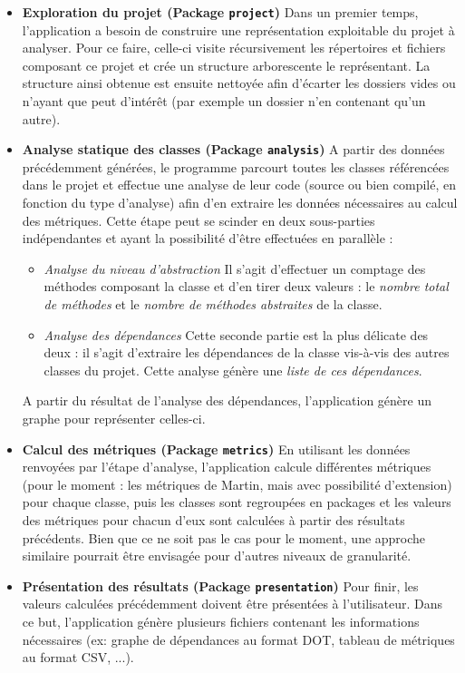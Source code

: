 \documentclass{scrartcl}
\begin{document}
    \begin{itemize}
        \bigbreak 
        \item[] \textbf{Exploration du projet (Package \texttt{project})} Dans un premier temps, l'application a besoin de construire une représentation exploitable du projet à analyser. Pour ce faire, celle-ci visite récursivement les répertoires et fichiers composant ce projet et crée un structure arborescente le représentant. La structure ainsi obtenue est ensuite nettoyée afin d'écarter les dossiers vides ou n'ayant que peut d'intérêt (par exemple un dossier n'en contenant qu'un autre).

        \bigbreak 
        \item[] \textbf{Analyse statique des classes (Package \texttt{analysis})} A partir des données précédemment générées, le programme parcourt toutes les classes référencées dans le projet et effectue une analyse de leur code (source ou bien compilé, en fonction du type d'analyse) afin d'en extraire les données nécessaires au calcul des métriques. Cette étape peut se scinder en deux sous-parties indépendantes et ayant la possibilité d'être effectuées en parallèle :
    	\begin{itemize}
    		\item \textit{Analyse du niveau d'abstraction} Il s'agit d'effectuer un comptage des méthodes composant la classe et d'en tirer deux valeurs : le \emph{nombre total de méthodes} et le \emph{nombre de méthodes abstraites} de la classe.
    		\item \textit{Analyse des dépendances} Cette seconde partie est la plus délicate des deux : il s'agit d'extraire les dépendances de la classe vis-à-vis des autres classes du projet. Cette analyse génère une \emph{liste de ces dépendances}.
    	\end{itemize}
	    A partir du résultat de l'analyse des dépendances, l'application génère un graphe pour représenter celles-ci.
	
	    \bigbreak 
	    \item[] \textbf{Calcul des métriques (Package \texttt{metrics})} En utilisant les données renvoyées par l'étape d'analyse, l'application calcule différentes métriques (pour le moment : les métriques de Martin, mais avec possibilité d'extension) pour chaque classe, puis les classes sont regroupées en packages et les valeurs des métriques pour chacun d'eux sont calculées à partir des résultats précédents. Bien que ce ne soit pas le cas pour le moment, une approche similaire pourrait être envisagée pour d'autres niveaux de granularité.
	
	    \bigbreak 
	    \item[] \textbf{Présentation des résultats (Package \texttt{presentation})} Pour finir, les valeurs calculées précédemment doivent être présentées à l'utilisateur. Dans ce but, l'application génère plusieurs fichiers contenant les informations nécessaires (ex: graphe de dépendances au format DOT, tableau de métriques au format CSV, ...).
	
	\end{itemize}
\end{document}
